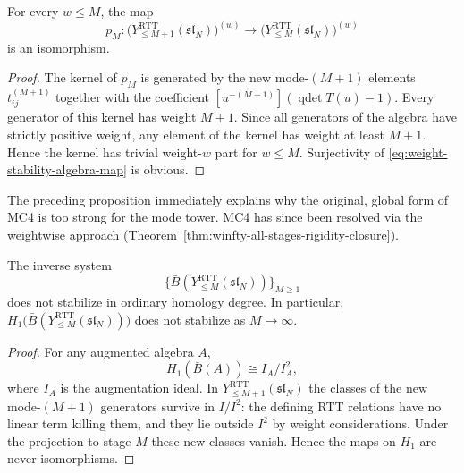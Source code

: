 \begin{proposition}
\ClaimStatusProvedHere
\label{prop:weight-stability-algebra-tower}
For every $w\le M$, the map
\begin{equation}
\label{eq:weight-stability-algebra-map}
p_M:
\big(Y^{\mathrm{RTT}}_{\le M+1}(\mathfrak{sl}_N)\big)^{(w)}
\longrightarrow
\big(Y^{\mathrm{RTT}}_{\le M}(\mathfrak{sl}_N)\big)^{(w)}
\end{equation}
is an isomorphism.
\end{proposition}

\begin{proof}
The kernel of $p_M$ is generated by the new mode-$(M+1)$ elements
$t^{(M+1)}_{ij}$ together with the coefficient
$[u^{-(M+1)}](\operatorname{qdet}T(u)-1)$. Every generator of this kernel
has weight $M+1$. Since all generators of the algebra have strictly
positive weight, any element of the kernel has weight at least $M+1$.
Hence the kernel has trivial weight-$w$ part for $w\le M$. Surjectivity
of \eqref{eq:weight-stability-algebra-map} is obvious.
\end{proof}

The preceding proposition immediately explains why the original, global
form of MC4 is too strong for the mode tower. MC4 has since been
resolved via the weightwise approach
(Theorem~\ref{thm:winfty-all-stages-rigidity-closure}).

\begin{proposition}
\ClaimStatusProvedHere
\label{prop:failure-unweighted-stabilization}
The inverse system
\begin{equation}
\{\bar B(Y^{\mathrm{RTT}}_{\le M}(\mathfrak{sl}_N))\}_{M\ge 1}
\end{equation}
does not stabilize in ordinary homology degree. In particular,
$H_1\big(\bar B(Y^{\mathrm{RTT}}_{\le M}(\mathfrak{sl}_N))\big)$ does not
stabilize as $M\to\infty$.
\end{proposition}

\begin{proof}
For any augmented algebra $A$,
\begin{equation}
H_1(\bar B(A))\cong I_A/I_A^2,
\end{equation}
where $I_A$ is the augmentation ideal. In
$Y^{\mathrm{RTT}}_{\le M+1}(\mathfrak{sl}_N)$ the classes of the new
mode-$(M+1)$ generators survive in $I/I^2$: the defining RTT relations
have no linear term killing them, and they lie outside $I^2$ by weight
considerations. Under the projection to stage $M$ these new classes
vanish. Hence the maps on $H_1$ are never isomorphisms.
\end{proof}

